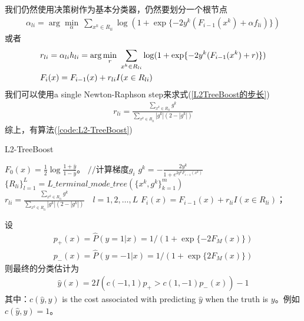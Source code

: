               我们仍然使用决策树作为基本分类器，仍然要划分一个根节点
              \begin{align*}
              \alpha_{li} = \arg\min_\alpha \ \sum_{x^k\in R_{li}}\log (1+\exp\{-2y^k(F_{i-1}(x^k)+\alpha f_{li})\})
              \end{align*}
              或者
              \begin{align}
              \label{L2TreeBoost的步长}
              & r_{li} = \alpha_{li}h_{li} = \arg\min_r \ \sum_{x^k\in R_{li}} \log (1+\exp\{-2y^k(F_{i-1}(x^k)+r)\})\\
              & F_i(x) = F_{i-1}(x)+r_{li}I({x\in R_{li}}) \notag
              \end{align}
              我们可以使用a single Newton-Raphson step来求式(\ref{L2TreeBoost的步长})
              \begin{align*}
              r_{li} = \frac{\sum\limits_{x^k\in R_{li}} g^k}{\sum\limits_{x^k\in R_{li}}|g^k|(2-|g^k|)}
              \end{align*}
              综上，有算法(\ref{code:L2-TreeBoost})
              \begin{algorithm}[H]
                  \caption{L2-TreeBoost}\label{code:L2-TreeBoost}
                  \begin{algorithmic}[1]
                      \State $F_0(x) = \frac{1}{2}\log \frac{1+\bar{y}}{1-\bar{y}}$。
                          \State $//$计算梯度$g_i$
                              \State $g^k = -\frac{2y^k}{1+e^{2y^k F_{i-1}(x^k)}}$
                          \EndFor
                          \State $\{R_{li}\}_{l=1}^L = L\_terminal\_mode\_tree(\{x^k,g^k\}_{k=1}^m)$
                          \State $r_{li} = \frac{\sum\limits_{x^k\in R_{li}} g^k}{\sum\limits_{x^k\in R_{li}}|g^k|(2-|g^k|)}\quad l=1,2,\dots,L$
                          \State $F_i(x) = F_{i-1}(x)+r_{li}I({x\in R_{li}})$；
                      \EndFor
                  \end{algorithmic}
              \end{algorithm}
              \par
              设
              \begin{align*}
              p_+(x) = \hat{P}(y=1|x) = 1/(1+\exp\{-2F_M(x)\})\\
              p_-(x) = \hat{P}(y=-1|x) = 1/(1+\exp\{2F_M(x)\})
              \end{align*}
              则最终的分类估计为
              \begin{align*}
              \hat{y}(x) = 2I(c(-1,1)p_+>c(1,-1)p_-(x))-1
              \end{align*}
              其中：$c(\hat{y},y)$ is the cost associated with predicting $\hat{y}$ when the truth is $y$。例如$c(\hat{y},y) = 1$。
